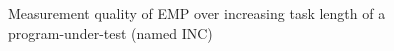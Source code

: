 \documentclass[10pt]{article}
\begin{document}
\begin{figure}[htp!]
	\centering
    \caption{Measurement quality of EMP over increasing task length of a program-under-test (named INC)}
    \label{fig:emp_comp}
\end{figure}


\end{document}
